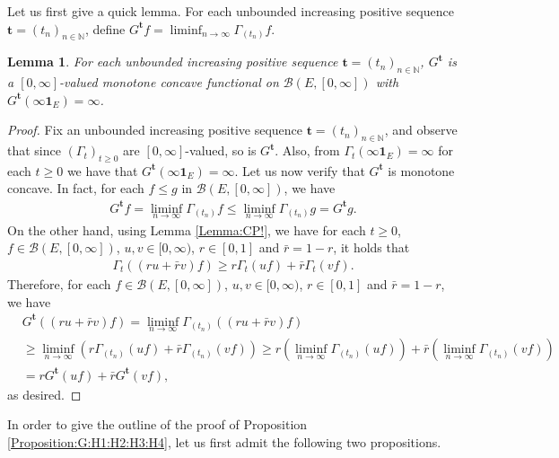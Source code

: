 \documentclass[12pt,a4paper]{amsart}
\numberwithin{equation}{section}
\theoremstyle{plain}
\newtheorem{lem}[thm]{Lemma}
\theoremstyle{definition}
\theoremstyle{remark}
\begin{document}
\subsubsection{}
Let us first give a quick lemma.
For each unbounded increasing positive sequence $\mathbf t = (t_n)_{n\in \mathbb N}$, define $G^\mathbf t f = \liminf_{n\to \infty} \Gamma_{(t_n)} f$.
\begin{lem} \label{Lemma:Gta!}
For each unbounded increasing positive sequence $\mathbf t = (t_n)_{n\in \mathbb N}$, $G^\mathbf t$ is a $[0,\infty]$-valued monotone concave functional on $\mathcal B(E,[0,\infty])$ with $G^\mathbf t(\infty \mathbf 1_E) = \infty$.
\end{lem}
\begin{proof}
Fix an unbounded increasing positive sequence $\mathbf t = (t_n)_{n\in \mathbb N}$, and observe that since $(\Gamma_t)_{t\geq 0}$ are $[0,\infty]$-valued, so is $G^{\mathbf t}$.
Also, from $\Gamma_t(\infty \mathbf 1_E) = \infty$ for each $t\geq 0$ we have that $G^{\mathbf t}(\infty \mathbf 1_E) = \infty$.
Let us now verify that $G^\mathbf t$ is monotone concave.
In fact, for each $f \leq g$ in $\mathcal B(E,[0,\infty])$, we have
\begin{align}
 G^{\mathbf t} f
 = \liminf_{n\to \infty} \Gamma_{(t_n)} f
   \leq \liminf_{n\to \infty} \Gamma_{(t_n)} g
  = G^{\mathbf t} g.
   \end{align}
On the other hand, using Lemma \ref{Lemma:CP!}, we have for each $t\geq 0$, $f\in \mathcal B(E,[0,\infty])$, $u,v \in [0,\infty)$, $r\in [0,1]$ and $\bar r = 1 - r$, it holds that
\begin{align}
 \Gamma_t((ru+\bar r v)f)
  \geq r \Gamma_t (uf) + \bar r \Gamma_t (vf).
 \end{align}
Therefore, for each $f\in \mathcal B(E,[0,\infty])$, $u,v \in [0,\infty)$, $r \in [0,1]$ and $\bar r = 1 - r$, we have
\begin{align}
 & G^{\mathbf t}((ru + \bar rv)f)
 = \liminf_{n \to \infty} \Gamma_{(t_n)}((ru + \bar rv)f)
 \\&\geq \liminf_{n\to \infty} (r\Gamma_{(t_n)} (uf) + \bar r\Gamma_{(t_n)}(vf))
 \geq r (\liminf_{n\to \infty} \Gamma_{(t_n)} (uf)) + \bar r (\liminf_{n\to \infty} \Gamma_{(t_n)}(vf) )
 \\&= r G^{\mathbf t} (uf) + \bar r G^{\mathbf t}(vf),
 \end{align}
as desired.
\end{proof}
In order to give the outline of the proof of Proposition \ref{Proposition:G:H1:H2:H3:H4}, let us first admit the following two propositions.
\end{document}

